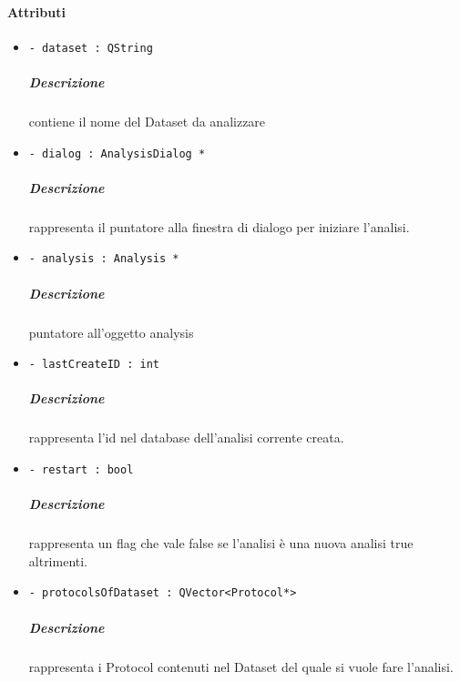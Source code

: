 	\paragraph{Attributi}
		\begin{itemize}
			\item \color{teal} \verb!- dataset : QString!
			\color{black}
			\subparagraph{Descrizione} contiene il nome del Dataset\g{} da analizzare
			\item \color{teal} \verb!- dialog : AnalysisDialog *!
			\color{black}
			\subparagraph{Descrizione} rappresenta il puntatore alla finestra di dialogo per iniziare l'analisi.
			\item \color{teal} \verb!- analysis : Analysis *!
			\color{black}
			\subparagraph{Descrizione} puntatore all'oggetto analysis
			\item \color{teal} \verb!- lastCreateID : int!
			\color{black}
			\subparagraph{Descrizione} rappresenta l'id nel database dell'analisi corrente creata.
			\item \color{teal} \verb!- restart : bool!
			\color{black}
			\subparagraph{Descrizione} rappresenta un flag che vale false se l'analisi è una nuova analisi true altrimenti.
			\item \color{teal} \verb!- protocolsOfDataset : QVector<Protocol*>!
			\color{black}
			\subparagraph{Descrizione} rappresenta i Protocol\g{} contenuti nel Dataset\g{} del quale si vuole fare l'analisi.
		\end{itemize}
